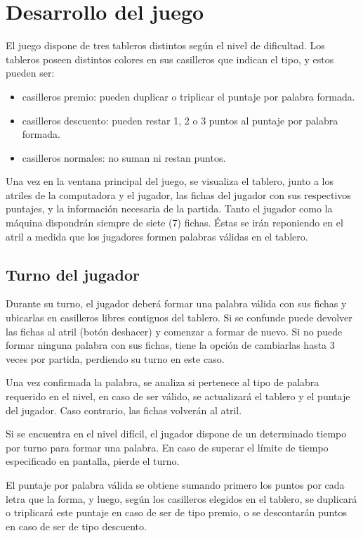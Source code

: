 \documentclass[11pt,fleqn]{book} %
\begin{document}
\section{Desarrollo del juego}
El juego dispone de tres tableros distintos según el nivel de dificultad. Los tableros poseen distintos colores en sus casilleros que indican el tipo, y estos pueden ser:
\begin{itemize}
    \item casilleros premio: pueden duplicar o triplicar el puntaje por palabra formada.
    \item casilleros descuento: pueden restar 1, 2 o 3 puntos al puntaje por palabra formada.
    \item casilleros normales: no suman ni restan puntos.
\end{itemize}
Una vez en la ventana principal del juego, se visualiza el tablero, junto a los atriles de la computadora y el jugador, las fichas del jugador con sus respectivos puntajes, y la información necesaria de la partida. Tanto el jugador como la máquina dispondrán siempre de siete (7) fichas. Éstas se irán reponiendo en el atril a medida que los jugadores formen palabras válidas en el tablero.

\subsection{Turno del jugador}
Durante su turno, el jugador deberá formar una palabra válida con sus fichas y ubicarlas en casilleros libres contiguos del tablero. Si se confunde puede devolver las fichas al atril (botón deshacer) y comenzar a formar de nuevo.  Si no puede formar ninguna palabra con sus fichas, tiene la opción de cambiarlas hasta 3 veces por partida, perdiendo su turno en este caso.

Una vez confirmada la palabra, se analiza si pertenece al tipo de palabra requerido en el nivel, en caso de ser válido, se actualizará el tablero y el puntaje del jugador. Caso contrario, las fichas volverán al atril.

Si se encuentra en el nivel difícil, el jugador dispone de un determinado tiempo por turno para formar una palabra. En caso de superar el límite de tiempo especificado en pantalla, pierde el turno.

El puntaje por palabra válida se obtiene sumando primero los puntos por cada letra que la forma, y luego, según los casilleros elegidos en el tablero, se duplicará o triplicará este puntaje en caso de ser de tipo premio, o se descontarán puntos en caso de ser de tipo descuento.
\end{document}
